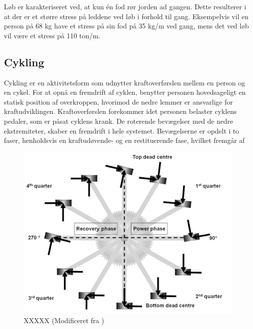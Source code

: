 Løb er karakteriseret ved, at kun én fod rør jorden ad gangen. Dette resulterer i at der er et større stress på leddene ved løb i forhold til gang. Eksempelvis vil en person på 68 kg have et stress på sin fod på 35 kg/m ved gang, mens det ved løb vil være et stress på 110 ton/m. \citep{Adelaar1986}




\subsection{Cykling}
Cykling er en aktivitetsform som udnytter kraftoverførslen mellem en person og en cykel. For at opnå en fremdrift af cyklen, benytter personen hovedsageligt en statisk position af overkroppen, hvorimod de nedre lemmer er ansvarlige for kraftudviklingen. \citep{Springer2014} \newline 
Kraftoverførslen forekommer idet personen belaster cyklens pedaler, som er påsat cyklens krank. De roterende bevægelser med de nedre ekstremiteter, skaber en fremdrift i hele systemet. Bevægelserne er opdelt i to faser, henholdsvis en kraftudøvende- og en restituerende fase, hvilket fremgår af 

\begin{figure}[H]
	\centering
	\includegraphics[scale=0.5]{figures/bProblemloesning/cykel_cyklus.png}
	\caption{XXXXX (Modificeret fra \citep{Springer2014})}
	\label{fig:cykel_cyklus}
\end{figure}

